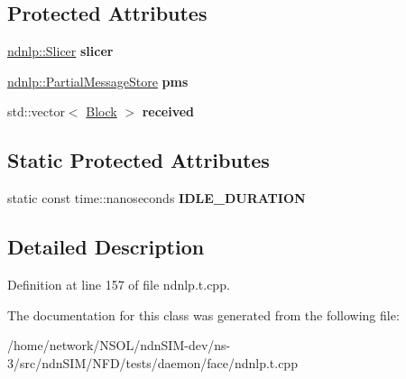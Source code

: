 \subsection*{Protected Attributes}
\begin{DoxyCompactItemize}
\item 
\hyperlink{classnfd_1_1ndnlp_1_1Slicer}{ndnlp\+::\+Slicer} {\bfseries slicer}\hypertarget{classnfd_1_1ndnlp_1_1tests_1_1ReassembleFixture_a33f3f0b599f0d1b0216d9a0fcec6457d}{}\label{classnfd_1_1ndnlp_1_1tests_1_1ReassembleFixture_a33f3f0b599f0d1b0216d9a0fcec6457d}

\item 
\hyperlink{classnfd_1_1ndnlp_1_1PartialMessageStore}{ndnlp\+::\+Partial\+Message\+Store} {\bfseries pms}\hypertarget{classnfd_1_1ndnlp_1_1tests_1_1ReassembleFixture_a4d89edd2c2deed86e7a70bd319fe977f}{}\label{classnfd_1_1ndnlp_1_1tests_1_1ReassembleFixture_a4d89edd2c2deed86e7a70bd319fe977f}

\item 
std\+::vector$<$ \hyperlink{classndn_1_1Block}{Block} $>$ {\bfseries received}\hypertarget{classnfd_1_1ndnlp_1_1tests_1_1ReassembleFixture_a22f9c15f3c30829713fd37f5cf223859}{}\label{classnfd_1_1ndnlp_1_1tests_1_1ReassembleFixture_a22f9c15f3c30829713fd37f5cf223859}

\end{DoxyCompactItemize}
\subsection*{Static Protected Attributes}
\begin{DoxyCompactItemize}
\item 
static const time\+::nanoseconds {\bfseries I\+D\+L\+E\+\_\+\+D\+U\+R\+A\+T\+I\+ON}\hypertarget{classnfd_1_1ndnlp_1_1tests_1_1ReassembleFixture_a0e6f4639ec19d724de691b93aa7f7813}{}\label{classnfd_1_1ndnlp_1_1tests_1_1ReassembleFixture_a0e6f4639ec19d724de691b93aa7f7813}

\end{DoxyCompactItemize}


\subsection{Detailed Description}


Definition at line 157 of file ndnlp.\+t.\+cpp.



The documentation for this class was generated from the following file\+:\begin{DoxyCompactItemize}
\item 
/home/network/\+N\+S\+O\+L/ndn\+S\+I\+M-\/dev/ns-\/3/src/ndn\+S\+I\+M/\+N\+F\+D/tests/daemon/face/ndnlp.\+t.\+cpp\end{DoxyCompactItemize}
